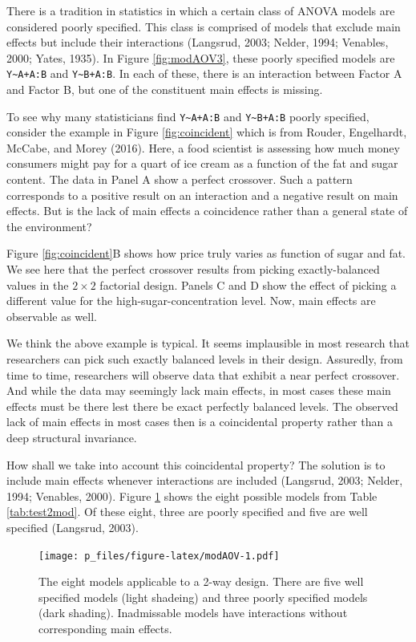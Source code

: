 \documentclass[
  english,
  ,man]{apa6}
\begin{document}
There is a tradition in statistics in which a certain class of ANOVA models are considered poorly specified. This class is comprised of models that exclude main effects but include their interactions (Langsrud, 2003; Nelder, 1994; Venables, 2000; Yates, 1935). In Figure \ref{fig:modAOV3}, these poorly specified models are \texttt{Y\textasciitilde{}A+A:B} and \texttt{Y\textasciitilde{}B+A:B}. In each of these, there is an interaction between Factor A and Factor B, but one of the constituent main effects is missing.

To see why many statisticians find \texttt{Y\textasciitilde{}A+A:B} and \texttt{Y\textasciitilde{}B+A:B} poorly specified, consider the example in Figure \ref{fig:coincident} which is from Rouder, Engelhardt, McCabe, and Morey (2016). Here, a food scientist is assessing how much money consumers might pay for a quart of ice cream as a function of the fat and sugar content. The data in Panel A show a perfect crossover. Such a pattern corresponds to a positive result on an interaction and a negative result on main effects. But is the lack of main effects a coincidence rather than a general state of the environment?

Figure \ref{fig:coincident}B shows how price truly varies as function of sugar and fat. We see here that the perfect crossover results from picking exactly-balanced values in the \(2\times 2\) factorial design. Panels C and D show the effect of picking a different value for the high-sugar-concentration level. Now, main effects are observable as well.

We think the above example is typical. It seems implausible in most research that researchers can pick such exactly balanced levels in their design. Assuredly, from time to time, researchers will observe data that exhibit a near perfect crossover. And while the data may seemingly lack main effects, in most cases these main effects must be there lest there be exact perfectly balanced levels. The observed lack of main effects in most cases then is a coincidental property rather than a deep structural invariance.

How shall we take into account this coincidental property? The solution is to include main effects whenever interactions are included (Langsrud, 2003; Nelder, 1994; Venables, 2000). Figure \ref{fig:modAOV} shows the eight possible models from Table \ref{tab:test2mod}. Of these eight, three are poorly specified and five are well specified (Langsrud, 2003).

\begin{figure}
\centering
\texttt{[image: p\_files/figure-latex/modAOV-1.pdf]}
\caption{\label{fig:modAOV}The eight models applicable to a 2-way design. There are five well specified models (light shadeing) and three poorly specified models (dark shading). Inadmissable models have interactions without corresponding main effects.}
\end{figure}
\end{document}
